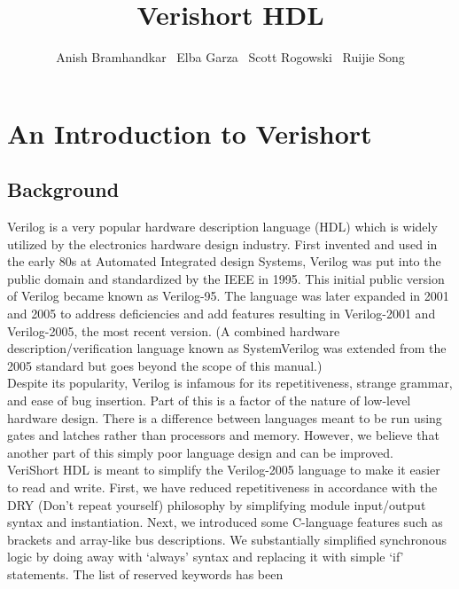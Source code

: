 \documentclass[letterpaper,11pt]{article}
\begin{document}
\title{Verishort HDL}
\author{Anish Bramhandkar \ Elba Garza \ Scott Rogowski \ Ruijie Song}
\renewcommand{\today}{December 22, 2010}
\maketitle

\newpage

\tableofcontents

\newpage

\section{An Introduction to Verishort}
    \subsection{Background}
    \indent Verilog is a very popular hardware description language (HDL) which is widely utilized by
    the electronics hardware design industry. First invented and used in the early 80s at
    Automated Integrated design Systems, Verilog was put into the public domain and
    standardized by the IEEE in 1995. This initial public version of Verilog became known as 
    Verilog-95. The language was later expanded in 2001 and 2005 to address deficiencies
    and add features resulting in Verilog-2001 and Verilog-2005, the most recent version. (A
    combined hardware description\slash verification language known as SystemVerilog was 
    extended from the 2005 standard but goes beyond the scope of this manual.) \\
    \indent Despite its popularity, Verilog is infamous for its repetitiveness, strange grammar, and 
    ease of bug insertion. Part of this is a factor of the nature of low-level hardware design. 
    There is a difference between languages meant to be run using gates and latches rather 
    than processors and memory. However, we believe that another part of this simply poor 
    language design and can be improved. \\
    \indent VeriShort HDL is meant to simplify the Verilog-2005 language to make it easier to read 
    and write. First, we have reduced repetitiveness in accordance with the DRY (Don’t 
    repeat yourself) philosophy by simplifying module input/output syntax and instantiation. 
    Next, we introduced some C-language features such as brackets and array-like bus 
    descriptions. We substantially simplified synchronous logic by doing away with ‘always’ 
    syntax and replacing it with simple ‘if’ statements. The list of reserved keywords has been 
\end{document}
